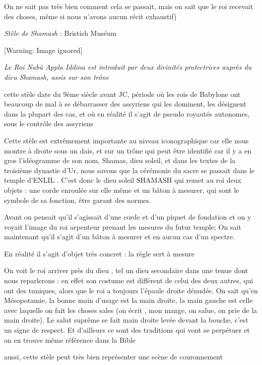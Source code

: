 \documentclass[a4paper,10pt]{article}
\begin{document}
\begin{itemize}
On ne sait pas très bien comment cela se passait, mais on sait que le
roi recevait des choses, même si nous n'avons aucun
récit exhaustif)

\textit{Stèle de Shamash} : Bristish Muséum

  [Warning: Image ignored] %
 

\textit{Le Roi Nabû Appla Iddina est introduit par deux divinités
protectrices auprès du dieu Shamash, assis sur son trône}

cette stèle date du 9ème siècle avant JC, période où les rois de
Babylone ont beaucoup de mal à se débarrasser des assyriens qui les
dominent, les désignent dans la plupart des cas, et où en réalité il
s'agit de pseudo royautés autonomes, sous le contrôle
des assyriens

Cette stèle est extrêmement importante au niveau iconographique car elle
nous montre à droite sous un dais, et sur un trône qui peut être
identifié car il y a en gros l'idéogramme de son nom,
Shamas, dieu soleil, et dans les textes de la troisième dynastie
d'Ur, nous savons que la cérémonie du sacre se passait
dans le temple d'ENLIL . C'est donc
le dieu soleil SHAMASH qui remet au roi deux objets : une corde
enroulée sur elle même et un bâton à mesurer, qui sont le symbole de sa
fonction, être garant des normes.

Avant on pensait qu'il s'agissait
d'une corde et d'un piquet de
fondation et on y voyait l'image du roi arpenteur
prenant les mesures du futur temple; On sait maintenant
qu'il s'agit d'un
bâton à mesurer et en aucun cas  d'un spectre.

En réalité il s'agit d'objet très
concret : la règle sert à mesure

On voit le roi arriver près du dieu , tel un dieu secondaire dans une
tenue dont nous reparlerons  : en effet son costume est différent de
celui des deux autres, qui ont des tuniques, alors que le roi  a
toujours l'épaule droite dénudée. On sait
qu'en Mésopotamie, la bonne main
d'usage est la main droite, la main gauche est celle
avec laquelle on fait les choses sales (on écrit , mon mange, on salue,
on prie de la  main droite). Le salut suprême se fait main droite levée
devant la bouche, c'est un signe de respect. Et
d'ailleurs ce sont des traditions qui vont se
perpétuer et on en trouve même référence dans la Bible

aussi, cette stèle peut très bien représenter une scène de couronnement


\end{itemize}
\end{document}
